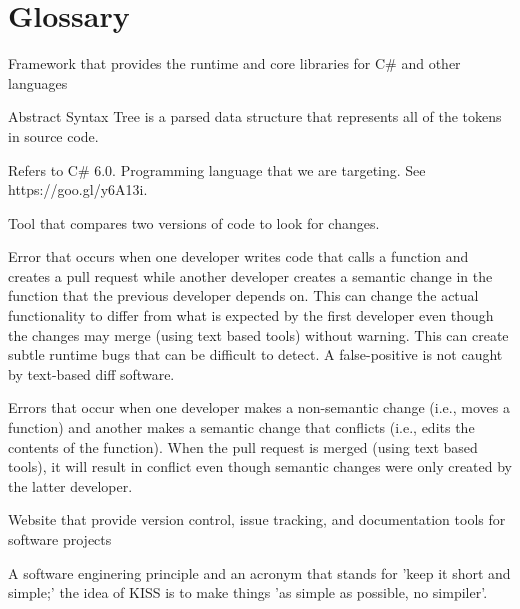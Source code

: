 \documentclass[draftclsnofoot,onecolumn]{IEEEtran}
\begin{document}
\section{Glossary}
\begin{description}

\item[.NET:] Framework that provides the runtime and core libraries for C\# 
and other languages

\item[AST:] Abstract Syntax Tree is a parsed data structure that represents 
all of the tokens in source code.

\item[C\#:] Refers to C\# 6.0. Programming language that we are targeting. 
See https://goo.gl/y6A13i.

\item[Diff:] Tool that compares two versions of code to look for changes.

\item[False-Positive:] Error that occurs when one developer writes code that 
calls a function and creates a pull request while another developer creates 
a semantic change in the function that the previous developer depends on. 
This can change the actual functionality to differ from what is expected by 
the first developer even though the changes may merge (using text based 
tools) without warning. This can create subtle runtime bugs that can be 
difficult to detect. A false-positive is not caught by text-based diff 
software.

\item[False-Negative:] Errors that occur when one developer makes a 
non-semantic change (i.e., moves a function) and another makes a semantic 
change that conflicts (i.e., edits the contents of the function). When the 
pull request is merged (using text based tools), it will result in conflict 
even though semantic changes were only created by the latter developer.

\item[GitHub:] Website that provide version control, issue tracking, and 
documentation tools for software projects

\item[KISS:] A software enginering principle and an acronym that stands for 
'keep it short and simple;' the idea of KISS is to make things 'as simple as 
possible, no simpiler'.


\end{description}
\end{document}
